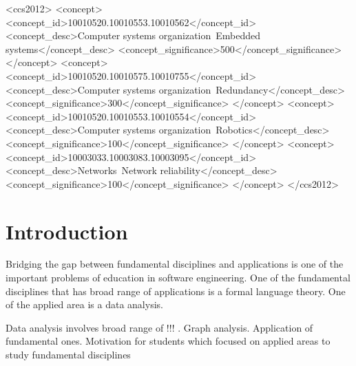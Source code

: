\documentclass[sigconf]{acmart}
\begin{document}
\begin{CCSXML}
<ccs2012>
 <concept>
  <concept_id>10010520.10010553.10010562</concept_id>
  <concept_desc>Computer systems organization~Embedded systems</concept_desc>
  <concept_significance>500</concept_significance>
 </concept>
 <concept>
  <concept_id>10010520.10010575.10010755</concept_id>
  <concept_desc>Computer systems organization~Redundancy</concept_desc>
  <concept_significance>300</concept_significance>
 </concept>
 <concept>
  <concept_id>10010520.10010553.10010554</concept_id>
  <concept_desc>Computer systems organization~Robotics</concept_desc>
  <concept_significance>100</concept_significance>
 </concept>
 <concept>
  <concept_id>10003033.10003083.10003095</concept_id>
  <concept_desc>Networks~Network reliability</concept_desc>
  <concept_significance>100</concept_significance>
 </concept>
</ccs2012>
\end{CCSXML}




\maketitle

\section{Introduction}

Bridging the gap between fundamental disciplines and applications is one of the important problems of education in software engineering.
One of the fundamental disciplines that has broad range of applications is a formal language theory.
One of the applied area is a data analysis.

Data analysis involves broad range of !!! .
Graph analysis.
Application of fundamental ones.
Motivation for students which focused on applied areas to study fundamental disciplines 
\end{document}

